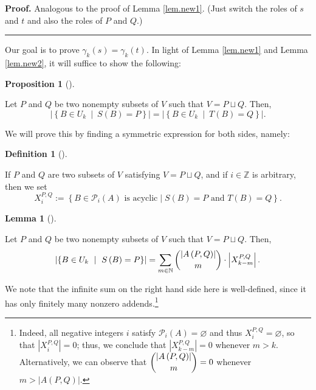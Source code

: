\documentclass[numbers=enddot,12pt,final,onecolumn,notitlepage]{scrartcl}%
\theoremstyle{definition}
\newtheorem{lem}[theo]{Lemma}
\newenvironment{lemma}[1][]
{\begin{lem}[#1]\begin{leftbar}}
{\end{leftbar}\end{lem}}
\newtheorem{prop}[theo]{Proposition}
\newenvironment{proposition}[1][]
{\begin{prop}[#1]\begin{leftbar}}
{\end{leftbar}\end{prop}}
\newtheorem{defi}[theo]{Definition}
\newenvironment{definition}[1][]
{\begin{defi}[#1]\begin{leftbar}}
{\end{leftbar}\end{defi}}
\newenvironment{proof}[1][Proof]{\noindent\textbf{#1.} }{\ \rule{0.5em}{0.5em}}
\let\sumnonlimits\sum
\renewcommand{\sum}{\sumnonlimits\limits}
\theoremstyle{plainsl}
\begin{document}
\begin{proof}
Analogous to the proof of Lemma \ref{lem.new1}. (Just switch the roles of $s$
and $t$ and also the roles of $P$ and $Q$.)
\end{proof}

Our goal is to prove $\gamma_{k}\left(  s\right)  =\gamma_{k}\left(  t\right)
$. In light of Lemma \ref{lem.new1} and Lemma \ref{lem.new2}, it will suffice
to show the following:

\begin{proposition}
\label{prop.new3}Let $P$ and $Q$ be two nonempty subsets of $V$ such that
$V=P\sqcup Q$. Then,%
\[
\left\vert \left\{  B\in U_{k}\ \mid\ S\left(  B\right)  =P\right\}
\right\vert =\left\vert \left\{  B\in U_{k}\ \mid\ T\left(  B\right)
=Q\right\}  \right\vert .
\]

\end{proposition}

We will prove this by finding a symmetric expression for both sides, namely:

\begin{definition}
If $P$ and $Q$ are two subsets of $V$ satisfying $V=P\sqcup Q$, and if
$i\in\mathbb{Z}$ is arbitrary, then we set%
\[
X_{i}^{P,Q}:=\left\{  B\in\mathcal{P}_{i}(A)\text{ is acyclic}\mid
S(B)=P\text{ and }T(B)=Q\right\}  .
\]

\end{definition}

\begin{lemma}
\label{lem.new4}Let $P$ and $Q$ be two nonempty subsets of $V$ such that
$V=P\sqcup Q$. Then,%
\[
\left\vert \left\{  B\in U_{k}\ \mid\ S\left(  B\right)  =P\right\}
\right\vert =\sum_{m\in\mathbb{N}}\dbinom{\left\vert A\left(  P,Q\right)
\right\vert }{m}\cdot\left\vert X_{k-m}^{P,Q}\right\vert .
\]

\end{lemma}

We note that the infinite sum on the right hand side here is well-defined,
since it has only finitely many nonzero addends.\footnote{Indeed, all negative
integers $i$ satisfy $\mathcal{P}_{i}\left(  A\right)  =\varnothing$ and thus
$X_{i}^{P,Q}=\varnothing$, so that $\left\vert X_{i}^{P,Q}\right\vert =0$;
thus, we conclude that $\left\vert X_{k-m}^{P,Q}\right\vert =0$ whenever
$m>k$. Alternatively, we can observe that $\dbinom{\left\vert A\left(
P,Q\right)  \right\vert }{m}=0$ whenever $m>\left\vert A\left(  P,Q\right)
\right\vert $.}
\end{document}
